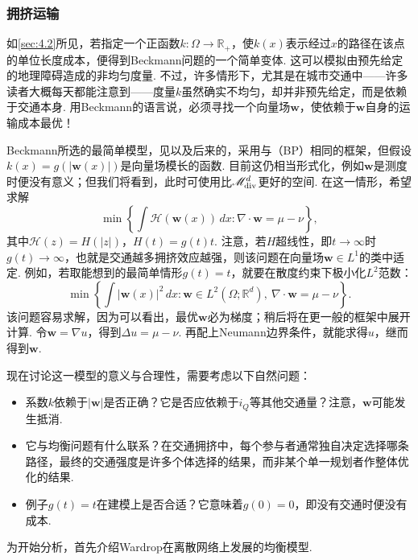 \subsubsection{拥挤运输}\label{sec:4.4.1}
\setcounter{theorem}{26}\setcounter{equation}{12}\setcounter{boxcounter}{4}\setcounter{figure}{3}\setcounter{footnote}{4}
如\autoref{sec:4.2}所见，若指定一个正函数$k:\Omega\to\mathbb R_+$，使$k(x)$表示经过$x$的路径在该点的单位长度成本，便得到Beckmann问题的一个简单变体. 这可以模拟由预先给定的地理障碍造成的非均匀度量. 不过，许多情形下，尤其是在城市交通中——许多读者大概每天都能注意到——度量$k$虽然确实不均匀，却并非预先给定，而是依赖于交通本身. 用Beckmann的语言说，必须寻找一个向量场$\mathbf w$，使依赖于$\mathbf w$自身的运输成本最优！

Beckmann所选的最简单模型，见\cite{b27}以及后来的\cite{b110}，采用与（BP）相同的框架，但假设$k(x)=g(|\mathbf w(x)|)$是向量场模长的函数. 目前这仍相当形式化，例如$\mathbf w$是测度时便没有意义；但我们将看到，此时可使用比$\mathscr M^d_{\rm div}$更好的空间. 在这一情形，希望求解
\begin{equation}\label{eq:4.13}
\min\left\{\int\mathscr H(\mathbf w(x))\,dx:\nabla\cdot\mathbf w=\mu-\nu\right\},
\end{equation}
其中$\mathscr H(z)=H(|z|)$，$H(t)=g(t)t$. 注意，若$H$超线性，即$t\to\infty$时$g(t)\to\infty$，也就是交通越多拥挤效应越强，则该问题在向量场$\mathbf w\in L^1$的类中适定. 例如，若取能想到的最简单情形$g(t)=t$，就要在散度约束下极小化$L^2$范数：
\[
\min\left\{\int|\mathbf w(x)|^2\,dx:
\mathbf w\in L^2(\Omega;\mathbb R^d),\ \nabla\cdot\mathbf w=\mu-\nu\right\}.
\]
该问题容易求解，因为可以看出，最优$\mathbf w$必为梯度；稍后将在更一般的框架中展开计算. 令$\mathbf w=\nabla u$，得到$\Delta u=\mu-\nu$. 再配上Neumann边界条件，就能求得$u$，继而得到$\mathbf w$.

现在讨论这一模型的意义与合理性，需要考虑以下自然问题：
\begin{itemize}
\item 系数$k$依赖于$|\mathbf w|$是否正确？它是否应依赖于$i_Q$等其他交通量？注意，$\mathbf w$可能发生抵消.
\item 它与均衡问题有什么联系？在交通拥挤中，每个参与者通常独自决定选择哪条路径，最终的交通强度是许多个体选择的结果，而非某个单一规划者作整体优化的结果.
\item 例子$g(t)=t$在建模上是否合适？它意味着$g(0)=0$，即没有交通时便没有成本.
\end{itemize}
\label{idx:i53-p152}
为开始分析，首先介绍Wardrop\cite{b295}在离散网络上发展的均衡模型.

